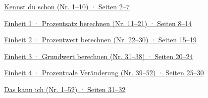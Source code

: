 \documentclass[11pt]{article}
\newcommand{\verzeile}[2]{\par\noindent\hyperlink{#1}{#2}\par\medskip}
\begin{document}
\weit
{}
\verzeile{zone}{Kennst du schon (Nr. 1–10) · Seiten 2–7}
\verzeile{e1}{Einheit 1 · Prozentsatz berechnen (Nr. 11–21) · Seiten 8–14}
\verzeile{e2}{Einheit 2 · Prozentwert berechnen (Nr. 22–30) · Seiten 15–19}
\verzeile{e3}{Einheit 3 · Grundwert berechnen (Nr. 31–38) · Seiten 20–24}
\verzeile{e4}{Einheit 4 · Prozentuale Veränderung (Nr. 39–52) · Seiten 25–30}
\verzeile{abhaken}{Das kann ich (Nr. 1–52) · Seiten 31–32}
\clearpage






\end{document}
